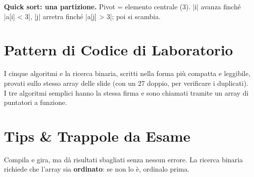 \needspace{5cm}
\textbf{Quick sort: una partizione.} Pivot = elemento centrale (3). \cc|i| avanza
finché \cc|a[i] < 3|, \cc|j| arretra finché \cc|a[j] > 3|; poi si scambia.
\begin{center}
\end{center}

\section{Pattern di Codice di Laboratorio}

I cinque algoritmi e la ricerca binaria, scritti nella forma più compatta e
leggibile, provati sullo stesso array delle slide (con un 27 doppio, per verificare
i duplicati). I tre algoritmi semplici hanno la stessa firma e sono chiamati tramite
un array di puntatori a funzione.


\section{Tips \& Trappole da Esame}

\begin{trappola}
Compila e gira, ma dà risultati sbagliati senza nessun errore. La ricerca binaria
richiede che l'array sia \textbf{ordinato}: se non lo è, ordinalo prima.
\end{trappola}

